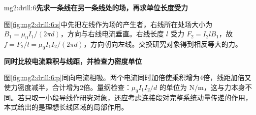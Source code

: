 \begin{drillsolution}{mg2:drill:6}\textbf{先求一条线在另一条线处的场，再求单位长度受力}\par\nobreak
图\ref{fig:mg2:drill:6:s}中先把左线作为场的产生者，右线所在处场大小为 $B_1=\mu_0I_1/(2\pi d)$，方向与右线电流垂直。右线长度 $l$ 受力 $F_2=I_2lB_1$，故 $f=F_2/l=\mu_0I_1I_2/(2\pi d)$，方向朝向左线。交换研究对象得到相反等大的力。



\par\medskip{}\noindent\textbf{同时比较电流乘积与线距，并检查力密度单位}\par\nobreak
图\ref{fig:mg2:drill:6:p}同向电流相吸。两个电流同时加倍使乘积增为4倍，线距加倍又使力密度减半，合计增为2倍。量纲检查：$\mu_0I_1I_2/d$ 的单位为 $\mathrm{N/m}$，这与力本身不同。若只取一小段导线作研究对象，还应考虑连接段对完整系统动量传递的作用，本式给出的是理想长线区域的局部作用。\end{drillsolution}
